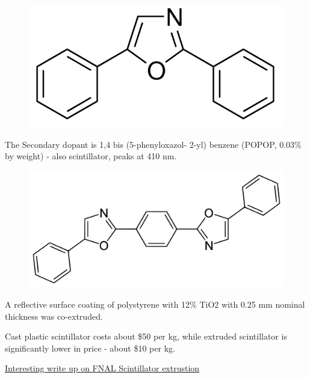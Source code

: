                 
            \begin{figure}[H]
    			\centering
    			\includegraphics[width=12cm]{Chapters/Ch2-Experiment/clas-12-exp/clas-detectors/fd/pics/2-5-diphenyloxazole.png}
			\end{figure}
                
                The Secondary dopant is 1,4 bis (5-phenyloxazol- 2-yl) benzene (POPOP, 0.03\% by weight) - also scintillator, peaks at 410 nm. 
                
                                
            \begin{figure}[H]
    			\centering
    			\includegraphics[width=12cm]{Chapters/Ch2-Experiment/clas-12-exp/clas-detectors/fd/pics/popop.png}
			\end{figure}
                
                
                
                A reflective surface coating of polystyrene with 12\% TiO2 with 0.25 mm nominal thickness was co-extruded. 
                
                Cast plastic scintillator costs about \$50 per kg, while extruded scintillator is significantly lower in price - about \$10 per kg. 
                
                \href{https://lss.fnal.gov/archive/2005/pub/fermilab-pub-05-344.pdf}{Interesting write up on FNAL Scintillator extrustion}


